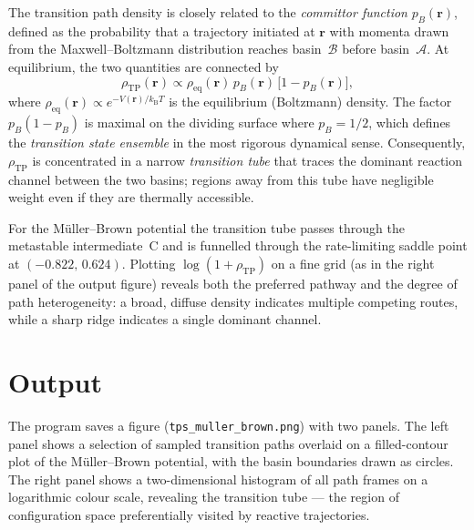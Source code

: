 \documentclass[11pt,a4paper]{article}
\begin{document}
The transition path density is closely related to the \emph{committor function}
$p_B(\mathbf{r})$, defined as the probability that a trajectory initiated at
$\mathbf{r}$ with momenta drawn from the Maxwell--Boltzmann distribution reaches
basin~$\mathcal{B}$ before basin~$\mathcal{A}$.  At equilibrium, the two
quantities are connected by~\cite{Bolhuis2002}
\begin{equation}
    \rho_\mathrm{TP}(\mathbf{r})
    \propto \rho_\mathrm{eq}(\mathbf{r})\,
            p_B(\mathbf{r})\,\bigl[1 - p_B(\mathbf{r})\bigr],
\end{equation}
where $\rho_\mathrm{eq}(\mathbf{r}) \propto e^{-V(\mathbf{r})/k_\mathrm{B}T}$
is the equilibrium (Boltzmann) density.  The factor
$p_B(1-p_B)$ is maximal on the dividing surface where $p_B = 1/2$, which
defines the \emph{transition state ensemble} in the most rigorous dynamical
sense.  Consequently, $\rho_\mathrm{TP}$ is concentrated in a narrow
\emph{transition tube} that traces the dominant reaction channel between the
two basins; regions away from this tube have negligible weight even if they are
thermally accessible.

For the M\"{u}ller--Brown potential the transition tube passes through the
metastable intermediate~C and is funnelled through the rate-limiting saddle
point at $(-0.822,\, 0.624)$.  Plotting $\log(1 + \rho_\mathrm{TP})$ on a
fine grid (as in the right panel of the output figure) reveals both the
preferred pathway and the degree of path heterogeneity: a broad, diffuse
density indicates multiple competing routes, while a sharp ridge indicates a
single dominant channel.

\section{Output}

The program saves a figure (\texttt{tps\_muller\_brown.png}) with two panels.
The left panel shows a selection of sampled transition paths overlaid on a
filled-contour plot of the M\"{u}ller--Brown potential, with the basin
boundaries drawn as circles.  The right panel shows a two-dimensional histogram
of all path frames on a logarithmic colour scale, revealing the transition
tube — the region of configuration space preferentially visited by reactive
trajectories.
\end{document}
